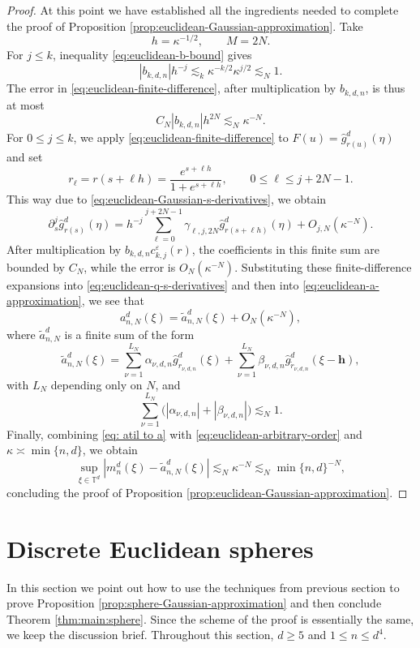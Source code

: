 \documentclass{article}
\theoremstyle{plain}
\numberwithin{equation}{section}
\begin{document}
\begin{proof}
At this point we have established all the ingredients needed to complete the proof of Proposition \ref{prop:euclidean-Gaussian-approximation}. Take
\[
 h=\kappa^{-1/2},
 \qquad
 M=2N.
\]
For $j\leq k$, inequality \eqref{eq:euclidean-b-bound} gives
\[
 |b_{k,d,n}|h^{-j}
 \lesssim_k \kappa^{-k/2}\kappa^{j/2}
 \lesssim_N 1.
\]
The error in
\eqref{eq:euclidean-finite-difference}, after multiplication
by $b_{k,d,n}$, is thus at most
\[
 C_{N}|b_{k,d,n}|h^{2N}
 \lesssim_N\kappa^{-N}.
\]
For $0\leq j\leq k$, we apply
\eqref{eq:euclidean-finite-difference} to
$F(u)=\widehat g_{r(u)}^d(\eta)$ and set
\[
 r_\ell=r(s+\ell h)
 =\frac{e^{s+\ell h}}{1+e^{s+\ell h}},
 \qquad 0\leq\ell\leq j+2N-1.
\]
This way due to
\eqref{eq:euclidean-Gaussian-s-derivatives}, we obtain
\[
 \partial_s^j\widehat g_{r(s)}^d(\eta)
 =
 h^{-j}
 \sum_{\ell=0}^{j+2N-1}
 \gamma_{\ell,j,2N}
 \widehat g_{r(s+\ell h)}^d(\eta)
 +
 O_{j,N}(\kappa^{-N}).
\]
After multiplication by
\(b_{k,d,n}c_{k,j}^{\varepsilon}(r)\), the coefficients in this
finite sum are bounded by \(C_{N}\), while the error is
\(O_{N}(\kappa^{-N})\). Substituting these finite-difference expansions into
\eqref{eq:euclidean-q-s-derivatives} and then into
\eqref{eq:euclidean-a-approximation}, we see that
\begin{equation}
\label{eq: atil to a}
a_{n,N}^d(\xi)=\tilde{a}_{n,N}^d(\xi)+O_{N}(\kappa^{-N}),
\end{equation}
where \(\tilde{a}_{n,N}^d\) is a finite sum of the form
\[
 \tilde{a}_{n,N}^d(\xi)
 =
 \sum_{\nu=1}^{L_N}
 \alpha_{\nu,d,n}
 \widehat g_{r_{\nu,d,n}}^d(\xi)
 +
 \sum_{\nu=1}^{L_N}
 \beta_{\nu,d,n}
 \widehat g_{\widetilde r_{\nu,d,n}}^d(\xi-\mathbf h),
\]
with \(L_N\) depending only on \(N\), and
\[
 \sum_{\nu=1}^{L_N}
 \bigl(
 |\alpha_{\nu,d,n}|
 +
 |\beta_{\nu,d,n}|
 \bigr)
 \lesssim_N 1.
\]
Finally, combining \eqref{eq: atil to a} with
\eqref{eq:euclidean-arbitrary-order} and
\(\kappa\asymp\min\{n,d\}\), we obtain
\[
 \sup_{\xi\in\mathbb T^d}
 |m_n^d(\xi)-\tilde{a}_{n,N}^d(\xi)|
 \lesssim_N\kappa^{-N}
 \lesssim_N\min\{n,d\}^{-N},
\]
concluding the proof of Proposition
\ref{prop:euclidean-Gaussian-approximation}.
\end{proof}

\section{Discrete Euclidean spheres}
\label{sec: spheres}
In this section we point out how to use the techniques from previous section to prove Proposition \ref{prop:sphere-Gaussian-approximation} and then conclude Theorem \ref{thm:main:sphere}. Since the scheme of the proof is essentially the same, we keep the discussion brief. Throughout this section, $d\geq5$ and $1\leq n\leq d^4$.
\end{document}
